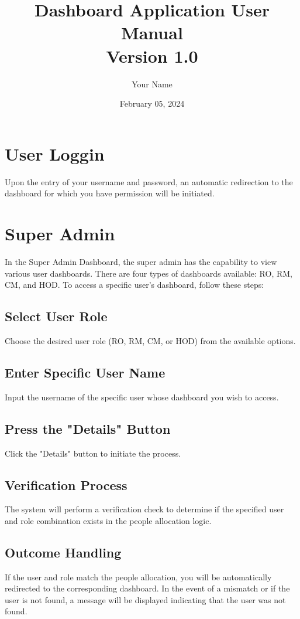 \documentclass{article}
\begin{document}
\title{Dashboard Application User Manual \\ Version 1.0}
\author{Your Name}
\date{February 05, 2024}
\maketitle

\tableofcontents
\newpage

\section{User Loggin}
Upon the entry of your username and password, an automatic redirection to the dashboard for which you have permission will be initiated.

\section{Super Admin}
In the Super Admin Dashboard, the super admin has the capability to view various user dashboards. There are four types of dashboards available: RO, RM, CM, and HOD. To access a specific user's dashboard, follow these steps:

\subsection{Select User Role}
Choose the desired user role (RO, RM, CM, or HOD) from the available options.

\subsection{Enter Specific User Name}
Input the username of the specific user whose dashboard you wish to access.

\subsection{Press the "Details" Button}
Click the "Details" button to initiate the process.

\subsection{Verification Process}
The system will perform a verification check to determine if the specified user and role combination exists in the people allocation logic.

\subsection{Outcome Handling}
If the user and role match the people allocation, you will be automatically redirected to the corresponding dashboard. In the event of a mismatch or if the user is not found, a message will be displayed indicating that the user was not found.
\end{document}
